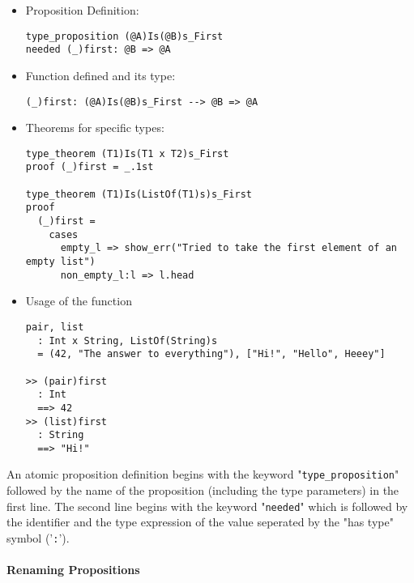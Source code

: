 \documentclass{article}
\begin{document}
\begin{itemize}
\begin{itemize}
\item Proposition Definition:

\begin{verbatim}
type_proposition (@A)Is(@B)s_First
needed (_)first: @B => @A
\end{verbatim}

\item Function defined and its type:

\begin{verbatim}
(_)first: (@A)Is(@B)s_First --> @B => @A
\end{verbatim}

\item Theorems for specific types:

\begin{verbatim}
type_theorem (T1)Is(T1 x T2)s_First
proof (_)first = _.1st

type_theorem (T1)Is(ListOf(T1)s)s_First
proof
  (_)first =
    cases
      empty_l => show_err("Tried to take the first element of an empty list")
      non_empty_l:l => l.head
\end{verbatim}

\item Usage of the function
\begin{verbatim}
pair, list
  : Int x String, ListOf(String)s
  = (42, "The answer to everything"), ["Hi!", "Hello", Heeey"]

>> (pair)first
  : Int
  ==> 42
>> (list)first
  : String
  ==> "Hi!"
\end{verbatim}
\end{itemize}

An atomic proposition definition begins with the keyword
"\verb|type_proposition|" followed by the name of the proposition (including
the type parameters) in the first line. The second line begins with the keyword
"\verb|needed|" which is followed by the identifier and the
type expression of the value seperated by the "has type" symbol ('\verb|:|').

\end{itemize}

\newpage

\paragraph{Renaming Propositions}
\end{document}
